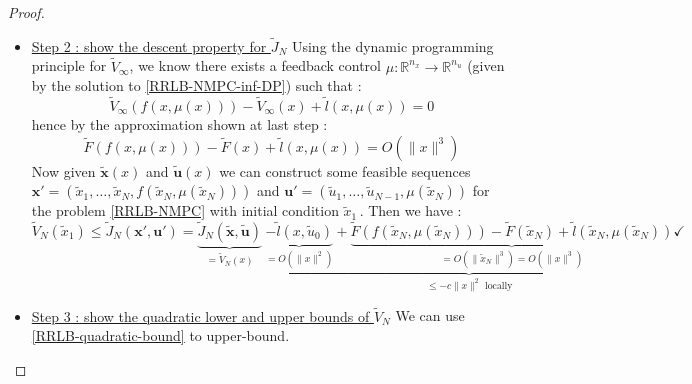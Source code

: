 \documentclass[12pt]{article}
\theoremstyle{definition}
\theoremstyle{remark}
\newcommand{\R}{\mathbb{R}}
\begin{document}
\begin{proof}
\begin{itemize}[label=\textbullet]
		\item \underline{Step 2 : show the descent property for $\tilde{J}_N$} \newline
		Using the dynamic programming principle for $\tilde{V}_\infty$, we know there exists a feedback control $\mu:\R^{n_x}\to\R^{n_u}$ (given by the solution to \ref{RRLB-NMPC-inf-DP}) such that :
		$$\tilde{V}_\infty(f(x,\mu(x)))-\tilde{V}_\infty(x)+\tilde{l}(x,\mu(x))=0$$
		hence by the approximation shown at last step :
		$$\tilde{F}(f(x,\mu(x)))-\tilde{F}(x)+\tilde{l}(x,\mu(x))=O(\|x\|^3)$$
		Now given $\tilde{\mathbf{x}}(x)$ and $\tilde{\mathbf{u}}(x)$ we can construct some feasible sequences $\mathbf{x}'=(\tilde{x}_1,\dots,\tilde{x}_N,f(\tilde{x}_N,\mu(\tilde{x}_N)))$ and $\mathbf{u}'=(\tilde{u}_1,\dots,\tilde{u}_{N-1},\mu(\tilde{x}_N))$ for the problem \ref{RRLB-NMPC} with initial condition $\tilde{x}_1$\,.
		Then we have :
		$$\tilde{V}_N(\tilde{x}_1)\leq\tilde{J}_N(\mathbf{x}',\mathbf{u}')=\underbrace{\tilde{J}_N(\tilde{\mathbf{x}},\tilde{\mathbf{u}})}_{=\tilde{V}_N(x)}~\underbrace{\underbrace{-\tilde{l}(x,\tilde{u}_0)}_{=O(\|x\|^2)}+\underbrace{\tilde{F}(f(\tilde{x}_N,\mu(\tilde{x}_N)))-\tilde{F}(\tilde{x}_N)+\tilde{l}(\tilde{x}_N,\mu(\tilde{x}_N)) }_{=O(\|\tilde{x}_N\|^3)=O(\|x\|^3)} }_{\leq-c\|x\|^2\text{ locally}}\checkmark$$
		
		\item{\underline{Step 3 : show the quadratic lower and upper bounds of $\tilde{V}_N$}}\newline
		We can use \ref{RRLB-quadratic-bound} to upper-bound.

	\end{itemize}
\end{proof}
\end{document}
